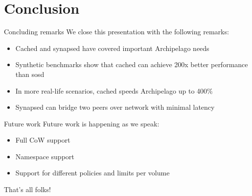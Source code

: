 \section{Conclusion}

\begin{frame}{Concluding remarks}
	We close this presentation with the following remarks:
	\begin{itemize}
		\item Cached and synapsed have covered important Archipelago needs
		\item Synthetic benchmarks show that cached can achieve 200x better 
			performance than sosd
		\item In more real-life scenarios, cached speeds Archipelago up to 
			400\%
		\item Synapsed can bridge two peers over network with minimal latency
	\end{itemize}
\end{frame}

\begin{frame}{Future work}
	Future work is happening as we speak:
	\begin{itemize}
		\item Full CoW support
		\item Namespace support
		\item Support for different policies and limits per volume
	\end{itemize}
\end{frame}

\begin{frame}{That's all folks!}


\end{frame}
